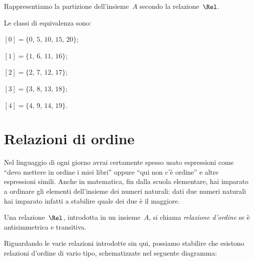 \begin{exrig}
\begin{esempio}
Rappresentiamo la partizione dell'insieme~$A$ secondo la relazione~$\Rel$.
\begin{center}
 
\end{center}
Le classi di equivalenza sono:
\begin{itemize*}
\item $ [0]=\{0\text{, }5\text{, }10\text{, }15\text{, }20\} $;
\item $ [1]=\{1\text{, }6\text{, }11\text{, }16\} $;
\item $ [2]=\{2\text{, }7\text{, }12\text{, }17\} $;
\item $ [3]=\{3\text{, }8\text{, }13\text{, }18\} $;
\item $ [4]=\{4\text{, }9\text{, }14\text{, }19\} $.
\end{itemize*}
 \end{esempio}
\end{exrig}

\ovalbox{\risolvii \ref{ese:\thechapter.27}, \ref{ese:\thechapter.28}, \ref{ese:\thechapter.29}, \ref{ese:\thechapter.30}, \ref{ese:\thechapter.31}\ref{ese:\thechapter.32}, \ref{ese:\thechapter.33}, \ref{ese:\thechapter.34}, \ref{ese:\thechapter.35}, \ref{ese:\thechapter.36}, \ref{ese:\thechapter.37}}

\section{Relazioni di ordine}

Nel linguaggio di ogni giorno avrai certamente spesso usato espressioni come ``devo mettere in ordine i miei
libri'' oppure ``qui non c'è ordine'' e altre espressioni simili.
Anche in matematica, fin dalla scuola elementare, hai imparato a ordinare gli elementi dell'insieme dei
numeri naturali: dati due numeri naturali hai imparato infatti a stabilire quale dei due è il maggiore.

\begin{definizione}
Una relazione~$\Rel$, introdotta in un insieme~$A$, si chiama \emph{relazione d'ordine} se è antisimmetrica e transitiva.
\end{definizione}

Riguardando le varie relazioni introdotte sin qui, possiamo stabilire che esistono relazioni d'ordine di vario tipo, schematizzate nel seguente diagramma:
\begin{center}
 
\end{center}

